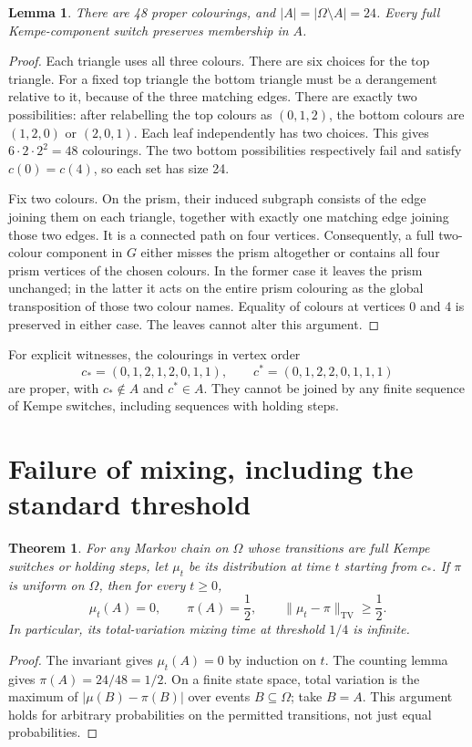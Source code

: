 \documentclass[11pt]{article}
\newtheorem{theorem}{Theorem}
\newtheorem{lemma}{Lemma}
\begin{document}
\begin{lemma}
There are 48 proper colourings, and $|A|=|\Omega\setminus A|=24$. Every full Kempe-component switch preserves membership in $A$.
\end{lemma}
\begin{proof}
Each triangle uses all three colours. There are six choices for the top triangle. For a fixed top triangle the bottom triangle must be a derangement relative to it, because of the three matching edges. There are exactly two possibilities: after relabelling the top colours as $(0,1,2)$, the bottom colours are $(1,2,0)$ or $(2,0,1)$. Each leaf independently has two choices. This gives $6\cdot2\cdot2^2=48$ colourings. The two bottom possibilities respectively fail and satisfy $c(0)=c(4)$, so each set has size 24.

Fix two colours. On the prism, their induced subgraph consists of the edge joining them on each triangle, together with exactly one matching edge joining those two edges. It is a connected path on four vertices. Consequently, a full two-colour component in $G$ either misses the prism altogether or contains all four prism vertices of the chosen colours. In the former case it leaves the prism unchanged; in the latter it acts on the entire prism colouring as the global transposition of those two colour names. Equality of colours at vertices 0 and 4 is preserved in either case. The leaves cannot alter this argument.
\end{proof}

For explicit witnesses, the colourings in vertex order
\[
c_*=(0,1,2,1,2,0,1,1),\qquad
c^*=(0,1,2,2,0,1,1,1)
\]
are proper, with $c_*\notin A$ and $c^*\in A$. They cannot be joined by any finite sequence of Kempe switches, including sequences with holding steps.

\section{Failure of mixing, including the standard threshold}
\begin{theorem}
For any Markov chain on $\Omega$ whose transitions are full Kempe switches or holding steps, let $\mu_t$ be its distribution at time $t$ starting from $c_*$. If $\pi$ is uniform on $\Omega$, then for every $t\geq0$,
\[
\mu_t(A)=0,\qquad \pi(A)=\frac12,
\qquad \|\mu_t-\pi\|_{\mathrm{TV}}\geq\frac12.
\]
In particular, its total-variation mixing time at threshold $1/4$ is infinite.
\end{theorem}
\begin{proof}
The invariant gives $\mu_t(A)=0$ by induction on $t$. The counting lemma gives $\pi(A)=24/48=1/2$. On a finite state space, total variation is the maximum of $|\mu(B)-\pi(B)|$ over events $B\subseteq\Omega$; take $B=A$. This argument holds for arbitrary probabilities on the permitted transitions, not just equal probabilities.
\end{proof}
\end{document}
